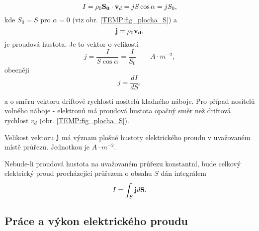 {      \begin{equation}\label{TEMP:eq_I_06}
        I = \rho_0 \mathbf{S_0}\cdot\mathbf{v}_d = jS\cos\alpha = jS_0, 
      \end{equation}      
      kde $S_0 = S$ pro $\alpha = 0$ (viz obr. \ref{TEMP:fig_plocha_S}) a   
      \begin{equation}\label{TEMP:eq_I_07}
        \mathbf{j} = \rho_0\mathbf{v_d}, 
      \end{equation}        
      je proudová hustota. Je to vektor o velikosti 
      \begin{equation}\label{TEMP:eq_I_08}
        j = \frac{I}{S\cos\alpha} = \frac{I}{S_0}  \qquad A\cdot m^{-2}, 
      \end{equation}   
      obecněji
      \begin{equation}\label{TEMP:eq_I_09}
        j = \frac{dI}{dS}, 
      \end{equation}

      a o směru vektoru driftové rychlosti nositelů kladného náboje. Pro případ nositelů volného
      náboje - elektronů má proudová hustota opačný směr než driftová rychlost $v_d$ (obr.
      \ref{TEMP:fig_plocha_S}).
      
      Velikost vektoru $\mathbf{j}$ má význam plošné hustoty elektrického proudu v uvažovaném místě
      průřezu. Jednotkou je $A\cdot m^{-2}$.
      
      Nebude-li proudová hustota na uvažovaném průřezu konstantní, bude celkový elektrický proud
      procházející průřezem o obsahu $S$ dán integrálem 
        \begin{equation}\label{TEMP:eq_I_10}
          I = \int_S \mathbf{j}d\mathbf{S}. 
        \end{equation} 

        

        

    \subsection{Práce a výkon elektrického proudu}
        
 
}

